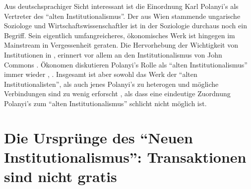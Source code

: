 Aus deutschsprachiger Sicht interessant ist die Einordnung Karl Polanyi's als Vertreter des "`alten Institutionalismus"'. Der aus Wien stammende ungarische Soziologe und Wirtschaftswissenschaftler ist in der Soziologie durchaus noch ein Begriff. Sein eigentlich umfangreicheres, ökonomisches Werk ist hingegen im Mainstream in Vergessenheit geraten. Die Hervorhebung der Wichtigkeit von Institutionen in \textcite{Polanyi1944}, erinnert vor allem an den Institutionalismus von John Commons \parencite{Maucourant1995}. Ökonomen diskutieren Polanyi's Rolle als "`alten Institutionalismus"' immer wieder \parencite[S. 183]{Hodgson1998}, \parencite{Cangiani2011}. Insgesamt ist aber sowohl das Werk der "`alten Institutionalisten"', als auch jenes Polanyi's zu heterogen und mögliche Verbindungen sind zu wenig erforscht \parencite{Frerichs2024}, als dass eine eindeutige Zuordnung Polanyi's zum "`alten Institutionalismus"' schlicht nicht möglich ist.


\section{Die Ursprünge des "`Neuen Institutionalismus"': Transaktionen sind nicht gratis} \label{sec: Neue Inst}

